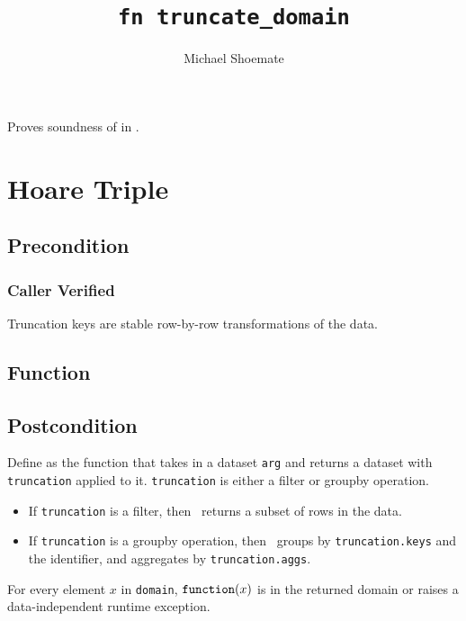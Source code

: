 \documentclass{article}
\title{\texttt{fn truncate\_domain}}
\author{Michael Shoemate}
\begin{document}
\maketitle  


\contrib

Proves soundness of  
in .

\section{Hoare Triple}
\subsection*{Precondition}
\subsubsection*{Caller Verified}
Truncation keys are stable row-by-row transformations of the data.

\subsection*{Function}
\label{sec:python-pseudocode}


\subsection*{Postcondition}
\begin{theorem}[Postcondition]
    Define \function as the function that takes in a dataset \texttt{arg} and returns a dataset with \texttt{truncation} applied to it.
    \texttt{truncation} is either a filter or groupby operation.
    \begin{itemize}
        \item If \texttt{truncation} is a filter, then \function\ returns a subset of rows in the data.
        \item If \texttt{truncation} is a groupby operation, then \function\ groups by \texttt{truncation.keys} and the identifier, and aggregates by \texttt{truncation.aggs}.
    \end{itemize}

    For every element $x$ in \texttt{domain}, $\texttt{function}(x)$ is in the returned domain or raises a data-independent runtime exception.
\end{theorem}
\end{document}
